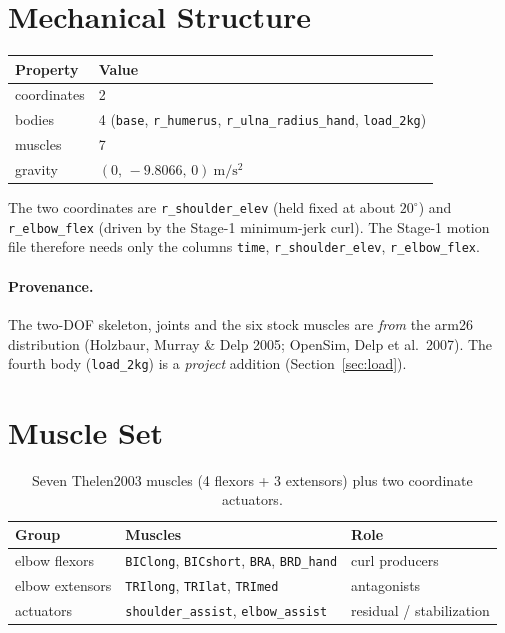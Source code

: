 \documentclass[11pt]{article}
\newcommand{\dg}{^{\circ}}
\begin{document}
\section{Mechanical Structure}

\begin{table}[h]
\centering
\begin{tabular}{ll}
\toprule
\textbf{Property} & \textbf{Value} \\
\midrule
coordinates & 2 \\
bodies & 4 (\texttt{base}, \texttt{r\_humerus}, \texttt{r\_ulna\_radius\_hand}, \texttt{load\_2kg}) \\
muscles & 7 \\
gravity & $(0,\,-9.8066,\,0)\ \si{\meter\per\second\squared}$ \\
\bottomrule
\end{tabular}
\end{table}

The two coordinates are \texttt{r\_shoulder\_elev} (held fixed at about $20\dg$)
and \texttt{r\_elbow\_flex} (driven by the Stage-1 minimum-jerk curl). The
Stage-1 motion file therefore needs only the columns
\texttt{time}, \texttt{r\_shoulder\_elev}, \texttt{r\_elbow\_flex}.

\paragraph{Provenance.} The two-DOF skeleton, joints and the six stock muscles
are \textit{from} the arm26 distribution (Holzbaur, Murray \& Delp 2005; OpenSim,
Delp et al.\ 2007). The fourth body (\texttt{load\_2kg}) is a \textit{project}
addition (Section~\ref{sec:load}).

\section{Muscle Set}

\begin{table}[h]
\centering
\begin{tabular}{lll}
\toprule
\textbf{Group} & \textbf{Muscles} & \textbf{Role} \\
\midrule
elbow flexors & \texttt{BIClong}, \texttt{BICshort}, \texttt{BRA}, \texttt{BRD\_hand} & curl producers \\
elbow extensors & \texttt{TRIlong}, \texttt{TRIlat}, \texttt{TRImed} & antagonists \\
actuators & \texttt{shoulder\_assist}, \texttt{elbow\_assist} & residual / stabilization \\
\bottomrule
\end{tabular}
\caption{Seven Thelen2003 muscles (4 flexors + 3 extensors) plus two coordinate actuators.}
\end{table}
\end{document}
